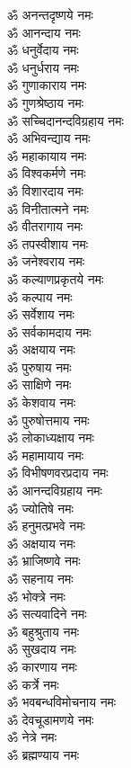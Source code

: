 \begin{multicols}{2}
\begin{flushleft}
ॐ अनन्तदृष्णये नमः\\
ॐ आनन्दाय नमः\hfill{}\\
ॐ धनुर्वेदाय नमः\\
ॐ धनुर्धराय नमः\\
ॐ गुणाकाराय नमः\\
ॐ गुणश्रेष्ठाय नमः\\
ॐ सच्चिदानन्दविग्रहाय नमः\\
ॐ अभिवन्द्याय नमः\\
ॐ महाकायाय नमः\\
ॐ विश्वकर्मणे नमः\\
ॐ विशारदाय नमः\\
ॐ विनीतात्मने नमः\hfill{}\\
ॐ वीतरागाय नमः\\
ॐ तपस्वीशाय नमः\\
ॐ जनेश्वराय नमः\\
ॐ कल्याणप्रकृतये नमः\\
ॐ कल्पाय नमः\\
ॐ सर्वेशाय नमः\\
ॐ सर्वकामदाय नमः\\
ॐ अक्षयाय नमः\\
ॐ पुरुषाय नमः\\
ॐ साक्षिणे नमः\hfill{}\\
ॐ केशवाय नमः\\
ॐ पुरुषोत्तमाय नमः\\
ॐ लोकाध्यक्षाय नमः\\
ॐ महामायाय नमः\\
ॐ विभीषणवरप्रदाय नमः\\
ॐ आनन्दविग्रहाय नमः\\
ॐ ज्योतिषे नमः\\
ॐ हनुमत्प्रभवे नमः\\
ॐ अक्षयाय नमः\\
ॐ भ्राजिष्णवे नमः\hfill{}\\
ॐ सहनाय नमः\\
ॐ भोक्त्रे नमः\\
ॐ सत्यवादिने नमः\\
ॐ बहुश्रुताय नमः\\
ॐ सुखदाय नमः\\
ॐ कारणाय नमः\\
ॐ कर्त्रे नमः\\
ॐ भवबन्धविमोचनाय नमः\\
ॐ देवचूडामणये नमः\\
ॐ नेत्रे नमः\hfill{}\\
ॐ ब्रह्मण्याय नमः\\

\end{flushleft}
\end{multicols}
